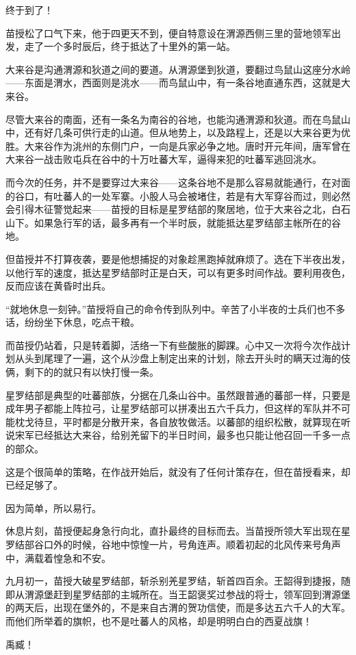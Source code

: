 终于到了！

苗授松了口气下来，他于四更天不到，便自特意设在渭源西侧三里的营地领军出发，走了一个多时辰后，终于抵达了十里外的第一站。

大来谷是沟通渭源和狄道之间的要道。从渭源堡到狄道，要翻过鸟鼠山这座分水岭——东面是渭水，西面则是洮水——而鸟鼠山中，有一条谷地直通东西，这就是大来谷。

尽管大来谷的南面，还有一条名为南谷的谷地，也能沟通渭源和狄道。而在鸟鼠山中，还有好几条可供行走的山道。但从地势上，以及路程上，还是以大来谷更为优胜。大来谷作为洮州的东侧门户，一向是兵家必争之地。唐时开元年间，唐军曾在大来谷一战击败屯兵在谷中的十万吐蕃大军，逼得来犯的吐蕃军逃回洮水。

而今次的任务，并不是要穿过大来谷——这条谷地不是那么容易就能通行，在对面的谷口，有吐蕃人的一处军寨。小股人马会被堵住，若是有大军穿谷而过，则必然会引得木征警觉起来——苗授的目标是星罗结部的聚居地，位于大来谷之北，白石山下。如果急行军的话，最多再有一个半时辰，就能抵达星罗结部主帐所在的谷地。

但苗授并不打算夜袭，要是他想捕捉的对象趁黑跑掉就麻烦了。选在下半夜出发，以他行军的速度，抵达星罗结部时正是白天，可以有更多时间作战。要利用夜色，反而应该在黄昏时出兵。

“就地休息一刻钟。”苗授将自己的命令传到队列中。辛苦了小半夜的士兵们也不多话，纷纷坐下休息，吃点干粮。

而苗授仍站着，只是转着脚，活络一下有些酸胀的脚踝。心中又一次将今次作战计划从头到尾理了一遍，这个从沙盘上制定出来的计划，除去开头时的瞒天过海的伎俩，剩下的的就只有以快打慢一条。

星罗结部是典型的吐蕃部族，分据在几条山谷中。虽然跟普通的蕃部一样，只要是成年男子都能上阵拉弓，让星罗结部可以拼凑出五六千兵力，但这样的军队并不可能枕戈待旦，平时都是分散开来，各自放牧做活。以蕃部的组织松散，就算现在听说宋军已经抵达大来谷，给别羌留下的半日时间，最多也只能让他召回一千多一点的部众。

这是个很简单的策略，在作战开始后，就没有了任何计策存在，但在苗授看来，却已经足够了。

因为简单，所以易行。

休息片刻，苗授便起身急行向北，直扑最终的目标而去。当苗授所领大军出现在星罗结部谷口外的时候，谷地中惊惶一片，号角连声。顺着初起的北风传来号角声中，满载着惶急和不安。

九月初一，苗授大破星罗结部，斩杀别羌星罗结，斩首四百余。王韶得到捷报，随即从渭源堡赶到星罗结部的主城所在。当王韶褒奖过参战的将士，领军回到渭源堡的两天后，出现在堡外的，不是来自古渭的贺功信使，而是多达五六千人的大军。而他们所举着的旗帜，也不是吐蕃人的风格，却是明明白白的西夏战旗！

禹臧！

